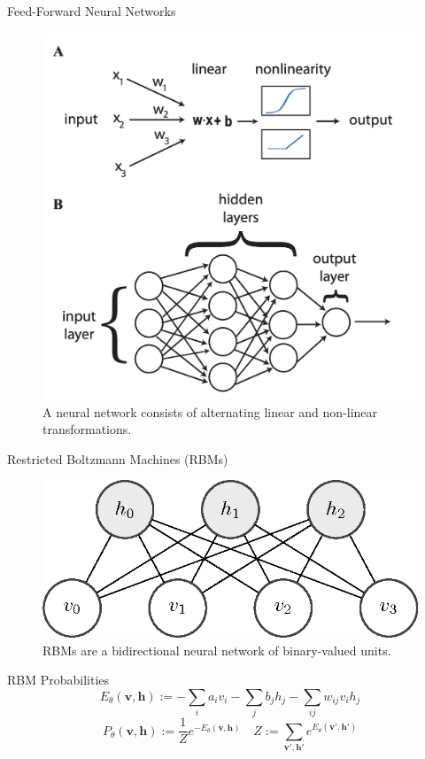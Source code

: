 \documentclass{beamer}
\newcommand{\bolds}[1]{\boldsymbol{#1}}
\newcommand{\bh}{\bolds{h}}
\newcommand{\bv}{\bolds{v}}
\begin{document}
\begin{frame}{Feed-Forward Neural Networks}
  \begin{figure}[ht]
    \centering \includegraphics[width=0.7/linewidth]{figures/ffnn.png}
    \caption{A neural network consists of alternating linear and
      non-linear transformations.}
  \end{figure}

\end{frame}

\begin{frame}{Restricted Boltzmann Machines (RBMs)}
  \begin{figure}[ht]
    \centering \includegraphics[width=0.7\linewidth]{figures/rbm.png}
    \caption{RBMs are a bidirectional neural network of binary-valued
      units.}
  \end{figure}
\end{frame}

\begin{frame}{RBM Probabilities}
  \begin{equation}%
    \boxed{E_\theta(\bv, \bh):=-\sum_i a_iv_i -\sum_j b_jh_j-\sum_{ij} w_{ij}v_ih_j \label{eq:rbm-energy-fn}}
  \end{equation}
  \begin{equation}%
    \boxed{P_\theta(\bv,\bh):=\frac{1}{Z}e^{-E_\theta(\bv,\bh)}\quad
      Z:=\sum_{\bv',\bh'}e^{E_\theta(\bv', \bh')}\label{eq:rbm-joint-dist}}
  \end{equation}%
\end{frame}
\end{document}
